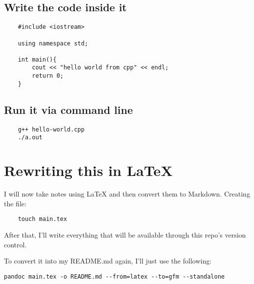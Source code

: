 \documentclass{article}
\begin{document}
\subsection{Write the code inside it}
\begin{verbatim}
    #include <iostream>

    using namespace std;

    int main(){
        cout << "hello world from cpp" << endl;
        return 0;
    }
\end{verbatim}

\subsection{Run it via command line}
\begin{verbatim}
    g++ hello-world.cpp
    ./a.out 
\end{verbatim}

\section{Rewriting this in \LaTeX}
I will now take notes using \LaTeX{} and then convert them to Markdown. Creating the file:

\begin{verbatim}
    touch main.tex
\end{verbatim}

After that, I'll write everything that will be available through this repo's version control.

To convert it into my README.md again, I'll just use the following:
\begin{verbatim}
pandoc main.tex -o README.md --from=latex --to=gfm --standalone
\end{verbatim}



\end{document}

